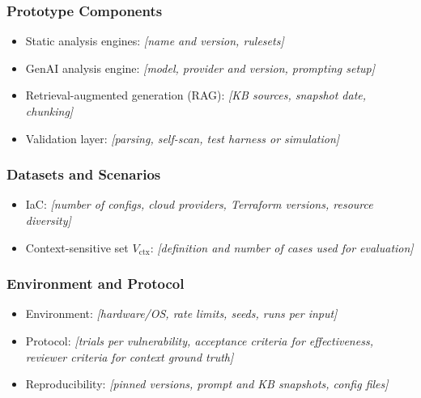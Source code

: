 \subsubsection*{Prototype Components}
\begin{itemize}
	\item Static analysis engines: \textit{[name and version, rulesets]}
	\item GenAI analysis engine: \textit{[model, provider and version, prompting setup]}
	\item Retrieval-augmented generation (RAG): \textit{[KB sources, snapshot date, chunking]}
	\item Validation layer: \textit{[parsing, self-scan, test harness or simulation]}
\end{itemize}

\subsubsection*{Datasets and Scenarios}
\begin{itemize}
	\item IaC: \textit{[number of configs, cloud providers, Terraform versions, resource diversity]}
	\item Context-sensitive set $V_{\text{ctx}}$: \textit{[definition and number of cases used for evaluation]}
\end{itemize}


\subsubsection*{Environment and Protocol}
\begin{itemize}
	\item Environment: \textit{[hardware/OS, rate limits, seeds, runs per input]}
	\item Protocol: \textit{[trials per vulnerability, acceptance criteria for effectiveness, reviewer criteria for context ground truth]}
	\item Reproducibility: \textit{[pinned versions, prompt and KB snapshots, config files]}
\end{itemize}

